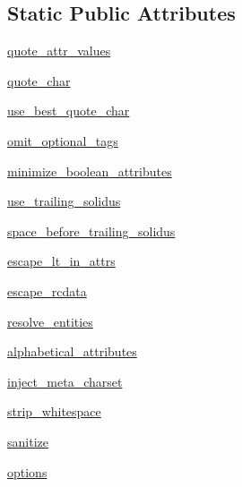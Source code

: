 \subsection*{Static Public Attributes}
\begin{DoxyCompactItemize}
\item 
\hyperlink{classpip_1_1__vendor_1_1html5lib_1_1serializer_1_1HTMLSerializer_a83125a26e67a20d93fc447cb5b3826df}{quote\+\_\+attr\+\_\+values}
\item 
\hyperlink{classpip_1_1__vendor_1_1html5lib_1_1serializer_1_1HTMLSerializer_ac157fe07f8cee401e25d32732c423320}{quote\+\_\+char}
\item 
\hyperlink{classpip_1_1__vendor_1_1html5lib_1_1serializer_1_1HTMLSerializer_a31220f011311f12e37f399b4884b110f}{use\+\_\+best\+\_\+quote\+\_\+char}
\item 
\hyperlink{classpip_1_1__vendor_1_1html5lib_1_1serializer_1_1HTMLSerializer_a1041c7c2b3fe97f1b67b54ab72c93ad8}{omit\+\_\+optional\+\_\+tags}
\item 
\hyperlink{classpip_1_1__vendor_1_1html5lib_1_1serializer_1_1HTMLSerializer_a01e892652112e4b0ea517246a6c59c75}{minimize\+\_\+boolean\+\_\+attributes}
\item 
\hyperlink{classpip_1_1__vendor_1_1html5lib_1_1serializer_1_1HTMLSerializer_a0d23a213dfb20fb314223ce4f5925418}{use\+\_\+trailing\+\_\+solidus}
\item 
\hyperlink{classpip_1_1__vendor_1_1html5lib_1_1serializer_1_1HTMLSerializer_a3df9fdb50aa849728ce8e91528e9d1e2}{space\+\_\+before\+\_\+trailing\+\_\+solidus}
\item 
\hyperlink{classpip_1_1__vendor_1_1html5lib_1_1serializer_1_1HTMLSerializer_ad433ad4447f9c656584be22e60435e79}{escape\+\_\+lt\+\_\+in\+\_\+attrs}
\item 
\hyperlink{classpip_1_1__vendor_1_1html5lib_1_1serializer_1_1HTMLSerializer_aeac75bc408dee24ef9fd48685be7c27d}{escape\+\_\+rcdata}
\item 
\hyperlink{classpip_1_1__vendor_1_1html5lib_1_1serializer_1_1HTMLSerializer_a3e7c232be00bcab4936b445627fef873}{resolve\+\_\+entities}
\item 
\hyperlink{classpip_1_1__vendor_1_1html5lib_1_1serializer_1_1HTMLSerializer_a27cab84c5b494bbfb081d00901915918}{alphabetical\+\_\+attributes}
\item 
\hyperlink{classpip_1_1__vendor_1_1html5lib_1_1serializer_1_1HTMLSerializer_ad49d61b6a14b18c66bbd69be16ce1b43}{inject\+\_\+meta\+\_\+charset}
\item 
\hyperlink{classpip_1_1__vendor_1_1html5lib_1_1serializer_1_1HTMLSerializer_a4e8d78c0c88a7f3216449d43ac6462c6}{strip\+\_\+whitespace}
\item 
\hyperlink{classpip_1_1__vendor_1_1html5lib_1_1serializer_1_1HTMLSerializer_a1cacafc4984e52018c32e44a23dc56c7}{sanitize}
\item 
\hyperlink{classpip_1_1__vendor_1_1html5lib_1_1serializer_1_1HTMLSerializer_adeb164f75037d0e6de34784c35bd54de}{options}
\end{DoxyCompactItemize}


